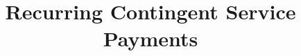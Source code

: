 \documentclass[orivec]{llncs}
\begin{document}
  \setlength\abovedisplayskip{0pt}
  \setlength\belowdisplayskip{0pt}


\newenvironment{packed_item}{
\begin{itemize}
	\setlength{\topsep}{0pt}
	\setlength{\partopsep}{0pt}
  \setlength{\itemsep}{0pt}
  \setlength{\parskip}{0pt}
  \setlength{\parsep}{0pt}
}{\end{itemize}}

\newenvironment{packed_enum}{
\begin{enumerate}
	\setlength{\topsep}{0pt}
	\setlength{\partopsep}{0pt}
  \setlength{\itemsep}{0pt}
  \setlength{\parskip}{0pt}
  \setlength{\parsep}{0pt}
}{\end{enumerate}}





\title{Recurring Contingent Service Payments}
%
%
\author{}
\institute{}


\maketitle              %
%
\begin{abstract}



\end{abstract}
 




\appendix

%


%
\end{document}
